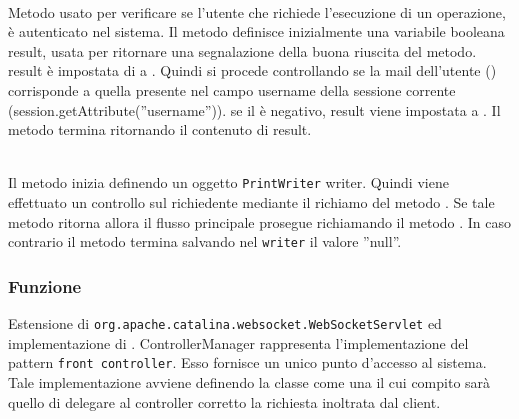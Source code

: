 \begin{description}
	\item{}\\
	Metodo usato per verificare se l'utente che richiede l'esecuzione di un operazione, è autenticato nel sistema. Il metodo definisce inizialmente una variabile booleana result, usata per ritornare una segnalazione della buona riuscita del metodo. result è impostata di  a . Quindi si procede controllando se la mail dell'utente () corrisponde a quella presente nel campo username della sessione corrente (session.getAttribute(''username'')). se il  è negativo, result viene impostata a . Il metodo termina ritornando il contenuto di result.
	\item{}\\
	Il metodo inizia definendo un oggetto \texttt{PrintWriter} writer. Quindi viene effettuato un controllo sul richiedente mediante il richiamo del metodo . Se tale metodo ritorna  allora il flusso principale prosegue richiamando il metodo . In caso contrario il metodo termina salvando nel \texttt{writer} il valore ''null''.
\end{description}


\subsubsection*{Funzione}
Estensione di \texttt{org.apache.catalina.websocket.WebSocketServlet} ed implementazione di . ControllerManager rappresenta l'implementazione del pattern \texttt{front controller}. Esso fornisce un unico punto d'accesso al sistema. Tale implementazione avviene definendo la classe come una  il cui compito sarà quello di delegare al controller corretto la richiesta inoltrata dal client.

